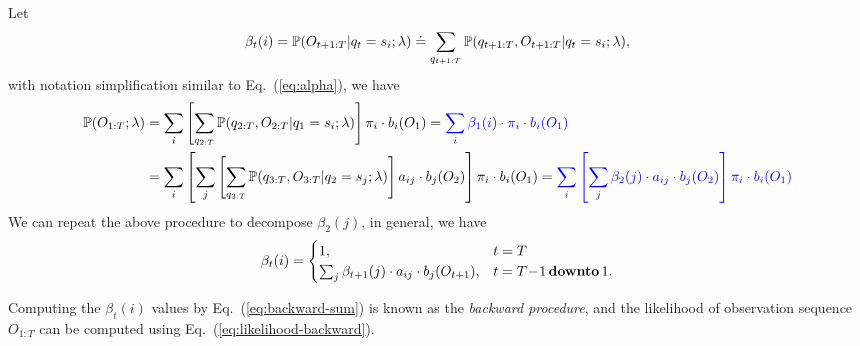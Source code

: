 
Let 
\begin{equation}
\label{eq:beta}
\beta_t(i) = \mathbb{P}(O_{t+1:T} |q_t = s_i; \lambda) \doteq \sum_{q_{t+1:T}} \mathbb{P}(q_{t+1:T}, O_{t+1:T} |q_t = s_i; \lambda),
\end{equation}
with notation simplification similar to Eq.~(\ref{eq:alpha}), we have
\begin{alignat}{2}
\mathbb{P}(O_{1:T} ;\lambda) 
&= \sum_{i} \left[ \sum_{q_{2:T}} \mathbb{P}(q_{2:T}, O_{2:T} |q_1 = s_i; \lambda) \right] \pi_i \cdot b_i(O_1) 
 = {\color{blue}{\sum_{i} \beta_1(i) \cdot \pi_i \cdot b_i(O_1)}}  \label{eq:likelihood-backward} \\
&= \sum_{i} \left[ \sum_{j} \left[ \sum_{q_{3:T}} \mathbb{P}(q_{3:T}, O_{3:T} |q_2 = s_j; \lambda) \right] a_{ij} \cdot b_j(O_2) \right] \pi_i \cdot b_i(O_1) 
 = {\color{blue}{\sum_{i} \left[ \sum_{j} \beta_2(j) \cdot a_{ij} \cdot b_j(O_2) \right] \pi_i \cdot b_i(O_1)}}  \nonumber
\end{alignat}
We can repeat the above procedure to decompose $\beta_2(j)$, in general, we have
\begin{equation}
\label{eq:backward-sum}
\beta_t(i) = \begin{cases}
              1, & t=T \\
              \sum_{j} \beta_{t+1}(j) \cdot a_{ij} \cdot b_j(O_{t+1}), & t=T\!-\!1 \,\textbf{downto}\, 1.
             \end{cases}
\end{equation}

Computing the $\beta_t(i)$ values by Eq.~(\ref{eq:backward-sum}) is known as the \emph{backward procedure}, 
and the likelihood of observation sequence $O_{1:T}$ can be computed using Eq.~(\ref{eq:likelihood-backward}).


